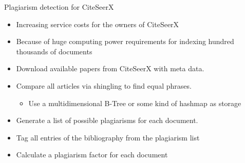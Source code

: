 \begin{frame}[c]
{Plagiarism detection for CiteSeerX}
\begin{itemize}
  
\begin{itemize}
	\item Increasing service costs for the owners of CiteSeerX
	\item Because of huge computing power requirements for indexing hundred
	thousands of documents
\end{itemize}
\end{itemize}
\end{frame} 

\begin{frame}[c]
\begin{itemize}
  \begin{itemize}
  \item Download available papers from CiteSeerX with meta data.
  \item Compare all articles via shingling to find equal phrases.
  \begin{itemize}
	\item Use a multidimensional B-Tree or some kind of hashmap as storage
  \end{itemize}
  \item Generate a list of possible plagiarisms for each document.
  \item Tag all entries of the bibliography from the plagiarism list
  \item Calculate a plagiarism factor for each document
\end{itemize}
\end{itemize} 

\end{frame}